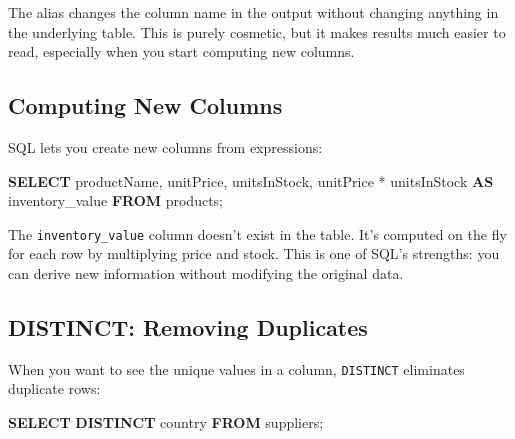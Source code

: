 \documentclass[
  letterpaper,
  DIV=11,
  numbers=noendperiod]{scrreprt}
\newenvironment{Shaded}{\begin{snugshade}}{\end{snugshade}}
\newcommand{\KeywordTok}[1]{\textcolor[rgb]{0.00,0.23,0.31}{\textbf{#1}}}
\newcommand{\NormalTok}[1]{\textcolor[rgb]{0.00,0.23,0.31}{#1}}
\newcommand{\OperatorTok}[1]{\textcolor[rgb]{0.37,0.37,0.37}{#1}}
\begin{document}
The alias changes the column name in the output without changing
anything in the underlying table. This is purely cosmetic, but it makes
results much easier to read, especially when you start computing new
columns.

\subsection{Computing New Columns}\label{computing-new-columns}

SQL lets you create new columns from expressions:

\begin{codelisting}

\caption{\texttt{duckdb}}

\begin{Shaded}
\begin{Highlighting}[]
\KeywordTok{SELECT}
\NormalTok{    productName,}
\NormalTok{    unitPrice,}
\NormalTok{    unitsInStock,}
\NormalTok{    unitPrice }\OperatorTok{*}\NormalTok{ unitsInStock }\KeywordTok{AS}\NormalTok{ inventory\_value}
\KeywordTok{FROM}\NormalTok{ products;}
\end{Highlighting}
\end{Shaded}

\end{codelisting}

The \texttt{inventory\_value} column doesn't exist in the table. It's
computed on the fly for each row by multiplying price and stock. This is
one of SQL's strengths: you can derive new information without modifying
the original data.

\subsection{DISTINCT: Removing
Duplicates}\label{distinct-removing-duplicates}

When you want to see the unique values in a column, \texttt{DISTINCT}
eliminates duplicate rows:

\begin{codelisting}

\caption{\texttt{duckdb}}

\begin{Shaded}
\begin{Highlighting}[]
\KeywordTok{SELECT} \KeywordTok{DISTINCT}\NormalTok{ country}
\KeywordTok{FROM}\NormalTok{ suppliers;}
\end{Highlighting}
\end{Shaded}

\end{codelisting}
\end{document}

